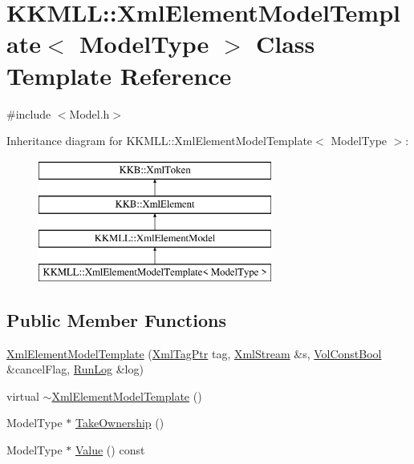 \hypertarget{class_k_k_m_l_l_1_1_xml_element_model_template}{}\section{K\+K\+M\+LL\+:\+:Xml\+Element\+Model\+Template$<$ Model\+Type $>$ Class Template Reference}
\label{class_k_k_m_l_l_1_1_xml_element_model_template}


{\ttfamily \#include $<$Model.\+h$>$}

Inheritance diagram for K\+K\+M\+LL\+:\+:Xml\+Element\+Model\+Template$<$ Model\+Type $>$\+:\begin{figure}[H]
\begin{center}
\leavevmode
\includegraphics[height=4.000000cm]{class_k_k_m_l_l_1_1_xml_element_model_template}
\end{center}
\end{figure}
\subsection*{Public Member Functions}
\begin{DoxyCompactItemize}
\item 
\hyperlink{class_k_k_m_l_l_1_1_xml_element_model_template_a20d0f9278e2ae7cecf0a60d320d9e32b}{Xml\+Element\+Model\+Template} (\hyperlink{namespace_k_k_b_a9253a3ea8a5da18ca82be4ca2b390ef0}{Xml\+Tag\+Ptr} tag, \hyperlink{class_k_k_b_1_1_xml_stream}{Xml\+Stream} \&s, \hyperlink{namespace_k_k_b_a7d390f568e2831fb76b86b56c87bf92f}{Vol\+Const\+Bool} \&cancel\+Flag, \hyperlink{class_k_k_b_1_1_run_log}{Run\+Log} \&log)
\item 
virtual \hyperlink{class_k_k_m_l_l_1_1_xml_element_model_template_a5c7d167890bcdd88aea6ca9c5d14b05f}{$\sim$\+Xml\+Element\+Model\+Template} ()
\item 
Model\+Type $\ast$ \hyperlink{class_k_k_m_l_l_1_1_xml_element_model_template_a69e664920663a6aace2f233fe9e4951a}{Take\+Ownership} ()
\item 
Model\+Type $\ast$ \hyperlink{class_k_k_m_l_l_1_1_xml_element_model_template_a25ef641bcb41db3c19594db4e688b993}{Value} () const 
\end{DoxyCompactItemize}
